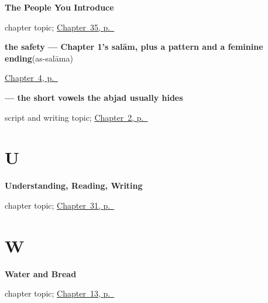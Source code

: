 \noindent\begin{minipage}[t]{\linewidth}
\raggedright
\textbf{The People You Introduce}\par
\footnotesize chapter topic; \hyperref[ch:ar-people-you-introduce]{Chapter~35, p.~\pageref*{ch:ar-people-you-introduce}}
\end{minipage}\par\smallskip

\noindent\begin{minipage}[t]{\linewidth}
\raggedright
\textbf{the safety — Chapter 1's salām, plus a pattern and a feminine ending}\enspace\emph{}\enspace(as-salāma)\par
\footnotesize \hyperref[ch:ar-farewells]{Chapter~4, p.~\pageref*{ch:ar-farewells}}
\end{minipage}\par\smallskip

\noindent\begin{minipage}[t]{\linewidth}
\raggedright
\textbf{   — the short vowels the abjad usually hides}\par
\footnotesize script and writing topic; \hyperref[ch:introductions]{Chapter~2, p.~\pageref*{ch:introductions}}
\end{minipage}\par\smallskip

\section*{U}

\noindent\begin{minipage}[t]{\linewidth}
\raggedright
\textbf{Understanding, Reading, Writing}\par
\footnotesize chapter topic; \hyperref[ch:ar-understanding-reading-writing]{Chapter~31, p.~\pageref*{ch:ar-understanding-reading-writing}}
\end{minipage}\par\smallskip

\section*{W}

\noindent\begin{minipage}[t]{\linewidth}
\raggedright
\textbf{Water and Bread}\par
\footnotesize chapter topic; \hyperref[ch:ar-water-and-bread]{Chapter~13, p.~\pageref*{ch:ar-water-and-bread}}
\end{minipage}\par\smallskip


